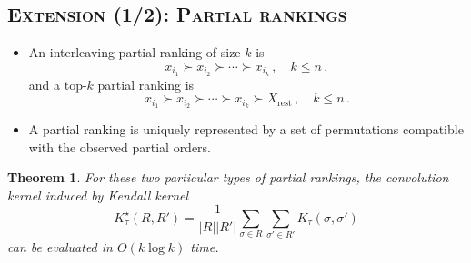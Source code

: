 \documentclass[xcolor=x11names,compress]{beamer}
\theoremstyle{plain}
\newtheorem{thm}{Theorem}
\renewcommand{\(}{\begin{columns}}
\renewcommand{\)}{\end{columns}}
\newcommand{\<}[1]{\begin{column}{#1}}
\renewcommand{\>}{\end{column}}
\begin{document}
\subsection{\scshape Extension (1/2): Partial rankings}
\begin{frame}{\insertsubsection}
	
	\begin{itemize}
		\item An interleaving partial ranking of size $k$ is
		$$ x_{i_1} \succ x_{i_2} \succ \cdots \succ x_{i_k} \,, \quad k\leq n \,, $$
		and a top-$k$ partial ranking is
		$$ x_{i_1} \succ x_{i_2} \succ \cdots \succ x_{i_k} \succ X_{\textrm{rest}} \,, \quad k\leq n \,. $$
		\item A partial ranking is \alert<1>{uniquely represented} by a set of permutations compatible with the observed partial orders.
	\end{itemize}
	
	\pause
	
	\begin{thm}
		For these two particular types of partial rankings, the \alert{convolution kernel} \cite{Haussler1999Convolution} induced by Kendall kernel
	$$ K_\tau^\star (R,R')=\frac{1}{|R||R'|} \sum_{\sigma\in R} \sum_{\sigma'\in R'}K_\tau (\sigma, \sigma') $$
	can be evaluated in \alert{$O(k\log k)$} time.
	\end{thm}
	
\end{frame}
\end{document}
